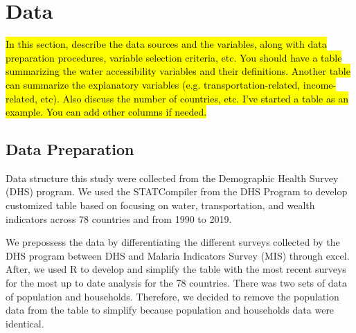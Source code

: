 \documentclass[10pt,twoside]{article}
\numberwithin{equation}{section}
\newcommand{\?}{\stackrel{?}{=}}
\begin{document}
\section{Data}
\hl{In this section, describe the data sources and the variables, along with data preparation procedures, variable
  selection criteria, etc. You should have a table summarizing the water accessibility variables and their
  definitions. Another table can summarize the explanatory variables (e.g. transportation-related, income-related,
  etc). Also discuss the number of countries, etc. I've started a table as an example. You can add other columns if needed.}
\subsection{Data Preparation}
Data structure this study were collected from the Demographic Health Survey (DHS) program. We used the STATCompiler from the DHS Program to develop customized table based on focusing on water, transportation, and wealth indicators across 78 countries and from 1990 to 2019.

We prepossess the data by differentiating the different surveys collected by the DHS program between DHS and Malaria Indicators Survey (MIS) through excel. After, we used R to develop and simplify the table with the most recent surveys for the most up to date analysis for the 78 countries. There was two sets of data of population and households. Therefore, we decided to remove the population data from the table to simplify because population and households data were identical. 
\end{document}
